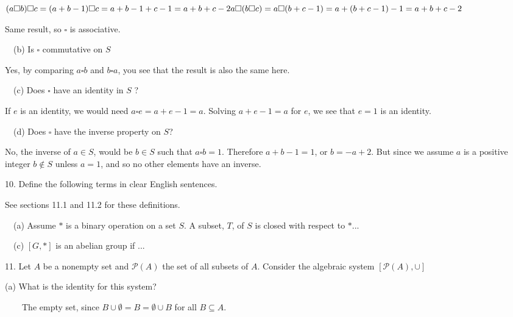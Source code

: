 \documentclass{article}
\begin{document}
\((a\square b)\square c= (a+b-1)\square c = a+b-1+c-1 = a+b+c-2\\
\\
a\square (b\square c)= a\square (b+c-1) = a+(b+c-1)-1 = a+b+c-2\)



Same result, so \(\square\) is associative.



$\quad $(b) { }Is \(\square\) { }commutative on \(S\)



Yes, { }by comparing \(a\square b\) and \(b\square a\), you see that the result is also the same here.



$\quad $(c) Does { }\(\square\) have an identity in \(S\) ?



If \(e\) is an identity, { }we would need \(a\square e=a+e-1 = a\). { }Solving \(a+e-1 = a\) for \(e\), we see that \(e=1\) is an identity. { }



$\quad $(d) { }Does { }\(\square\) have the inverse property on \(S\)?



No, the inverse of { }\(a\in S\), { }would be \(b\in S\) { }such that \(a\square b=1\). { } Therefore \(a+b-1=1\), or \(b=-a+2\). { }But since we
assume \(a\) is a positive integer \(b \notin S\) unless \(a = 1\), { }and so no other elements have an inverse.



10. { }Define the following terms in clear English sentences.



See sections 11.1 and 11.2 for these definitions.



$\quad $(a) { } { }Assume \(*\) is a binary operation on a set \(S\). { } A subset, \(T\), of \(S\) is closed with respect to \(*\)...



$\quad $(c) { }\([G,*]\) is an abelian group if ...



11. Let \(A\) be a nonempty set and \(\mathcal{P}(A)\) the set of all subsets of \(A\). Consider the algebraic system \([\mathcal{P}(A),\cup ]\)



(a) What is the identity for this system?



$\quad \quad $The empty set, since { } \(B \cup \emptyset =B=\emptyset \cup B\) { }for all \(B\subseteq A\).
\end{document}
